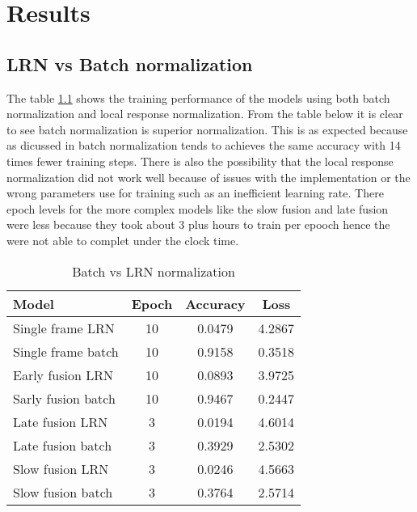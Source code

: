 
    \chapter{Results}
  \section{LRN vs Batch normalization}
The table \ref{lrnvsbatch} shows the training performance of the models using both batch normalization and local response normalization. From the table below it is clear to see batch normalization is superior normalization. This is as expected because as  dicussed in \citep{ioffe2015batch}  batch normalization tends to achieves the same accuracy with 14 times fewer training steps. There is also the possibility that the local response normalization did not work well because of issues with the implementation or the wrong parameters use for training such as an inefficient learning rate. There  epoch levels for the more complex models like the slow fusion and late fusion were less because they took about 3 plus hours to train per epooch hence the were not able to complet under the clock time. 
\begin{table}[h!]
\centering
\begin{tabular}{ |l|c|c|c| } 
 \hline
 Model & Epoch & Accuracy & Loss \\ 
  \hline
 Single frame LRN & 10 & 0.0479 & 4.2867 \\ 
 Single frame batch  & 10 & 0.9158 & 0.3518 \\ 
 Early fusion LRN & 10 & 0.0893 & 3.9725 \\
 Sarly fusion batch & 10 & 0.9467 &  0.2447  \\
 Late fusion LRN & 3 & 0.0194 &  4.6014  \\
 Late fusion batch & 3 & 0.3929  & 2.5302 \\
 Slow fusion LRN & 3 & 0.0246 & 4.5663  \\
 Slow fusion batch & 3 & 0.3764  & 2.5714  \\
 \hline
\end{tabular}
\caption{Batch vs LRN normalization}
\label{lrnvsbatch}
\end{table}

